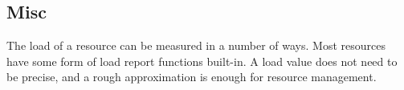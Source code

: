 \subsection{Misc}

The load of a resource can be measured in a number of ways.  Most
resources have some form of load report functions built-in.
A load value does not need to be precise, and a rough approximation is
enough for resource management.
